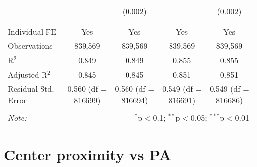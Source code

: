\documentclass[
]{article}
\begin{document}
\begin{table}[!htbp]
{\begin{tabular}{@{\extracolsep{5pt}}lcccc}
  &  & (0.002) &  & (0.002) \\ 
  & & & & \\ 
\hline \\[-1.8ex] 
Individual FE & Yes & Yes & Yes & Yes \\ 
Observations & 839,569 & 839,569 & 839,569 & 839,569 \\ 
R$^{2}$ & 0.849 & 0.849 & 0.855 & 0.855 \\ 
Adjusted R$^{2}$ & 0.845 & 0.845 & 0.851 & 0.851 \\ 
Residual Std. Error & 0.560 (df = 816699) & 0.560 (df = 816694) & 0.549 (df = 816691) & 0.549 (df = 816686) \\ 
\hline 
\hline \\[-1.8ex] 
\textit{Note:}  & \multicolumn{4}{r}{$^{*}$p$<$0.1; $^{**}$p$<$0.05; $^{***}$p$<$0.01} \\ 
\end{tabular}
} 
\end{table} 
\newpage
\section{Center proximity vs PA}
\end{document}

